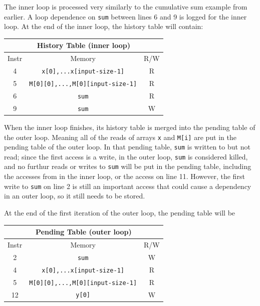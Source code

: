 \documentclass[12pt,twoside]{reedthesis}
\begin{document}
		The inner loop is processed very similarly to the cumulative sum example from earlier. A loop dependence on \texttt{sum} between lines 6 and 9 is logged for the inner loop. At the end of the inner loop, the history table will contain:
		
		\begin{tabular}{ |c|c|c| } 
			\hline
			\multicolumn{3}{|c|}{History Table (inner loop)} \\
			\hline
			Instr & Memory & R/W \\ 
			\hline
			4 & \texttt{x[0],...x[input-size-1]} & R \\ 
			5 & \texttt{M[0][0],...,M[0][input-size-1]} & R \\ 
			6 & \texttt{sum} & R \\ 
			9 & \texttt{sum} & W \\ 
			\hline
		\end{tabular}
	
		When the inner loop finishes, its history table is merged into the pending table of the outer loop. Meaning all of the reads of arrays \texttt{x} and \texttt{M[i]} are put in the pending table of the outer loop. In that pending table, \texttt{sum} is written to but not read; since the first access is a write, in the outer loop, \texttt{sum} is considered killed, and no furthur reads or writes to \texttt{sum} will be put in the pending table, including the accesses from in the inner loop, or the access on line 11. 
		However, the first write to \texttt{sum} on line 2 is still an important access that could cause a dependency in an outer loop, so it still needs to be stored. 
		
		At the end of the first iteration of the outer loop, the pending table will be
			
		\begin{tabular}{ |c|c|c| } 
			\hline
			\multicolumn{3}{|c|}{Pending Table (outer loop)} \\
			\hline
			Instr & Memory & R/W \\ 
			\hline
			2 & \texttt{sum} & W \\ 
			4 & \texttt{x[0],...x[input-size-1]} & R \\ 
			5 & \texttt{M[0][0],...,M[0][input-size-1]} & R \\ 
			12 & \texttt{y[0]} & W \\
			\hline
		\end{tabular}
	
\end{document}
